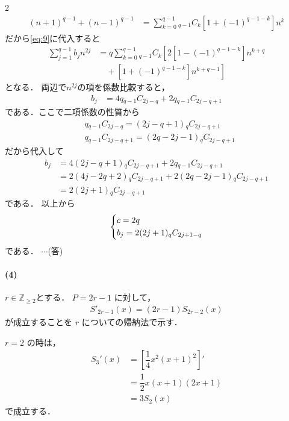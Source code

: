 \documentclass[../../main.tex]{subfiles}
\begin{document}
\begin{multicols}{2}
\begin{align}
    (n+1)^{q-1}+(n-1)^{q-1}
    & = \sum_{k=0}^{q-1} {}_{q-1}C_{k} \left[1 + (-1)^{q-1-k}\right]n^{k}
  \end{align}
  だから\cref{eq:9}に代入すると
  \begin{align}
    \sum_{j=1}^{q-1} b_{j} n^{2j}
    & = q \sum_{k=0}^{q-1} {}_{q-1}C_{k} \left[2\left[1-(-1)^{q-1-k}\right] n^{k+q} \right. \\
    & \quad + \left.\left[1 + (-1)^{q-1-k}\right]n^{k+q-1}\right]
  \end{align}
  となる．
  両辺で$n^{2j}$の項を係数比較すると，
  \begin{align}
    b_{j}
    & = 4q{}_{q-1}C_{2j-q} + 2q{}_{q-1}C_{2j-q+1}
  \end{align}
  である．ここで二項係数の性質から
  \begin{align}
    & q {}_{q-1}C_{2j-q} = (2j-q+1){}_{q}C_{2j-q+1}   \\
    & q{}_{q-1}C_{2j-q+1} = (2q-2j-1){}_{q}C_{2j-q+1}
  \end{align}
  だから代入して
  \begin{align}
    b_{j}
    & = 4(2j-q+1){}_{q}C_{2j-q+1} + 2q{}_{q-1}C_{2j-q+1}        \\
    & = 2(4j-2q+2){}_{q}C_{2j-q+1} + 2(2q-2j-1){}_{q}C_{2j-q+1} \\
    & = 2(2j+1){}_{q}C_{2j-q+1}
  \end{align}
  である．
  以上から
  \begin{align}
    \begin{dcases}
      c = 2q \\
      b_{j} = 2(2j+1){}_{q}C_{2j+1-q}
    \end{dcases}
  \end{align}
  である．
  $\cdots$(答)

  \paragraph{(4)}
  $r \in \mathbb{Z}_{\ge 2}$とする．
  $P=2r-1$ に対して，
  \begin{align}
    S'_{2r-1}(x) = (2r-1)S_{2r-2}(x) \label{eq:10}
  \end{align}
  が成立することを $r$ についての帰納法で示す．

  $r=2$ の時は，
  \begin{align}
    S_3'(x)
    & = \left[\dfrac{1}{4}x^2(x+1)^2\right]' \\
    & = \dfrac{1}{2}x(x+1)(2x+1)             \\
    & = 3S_2(x)
  \end{align}
  で成立する．


\end{multicols}
\end{document}
